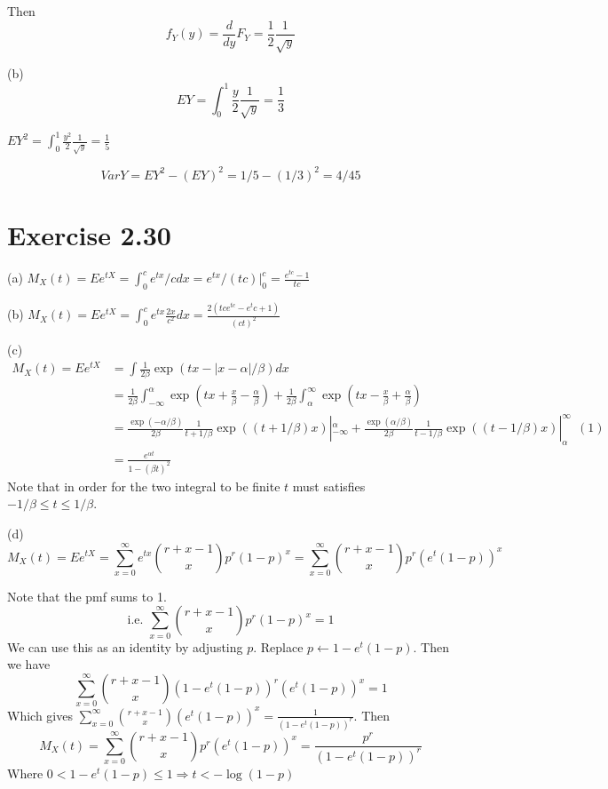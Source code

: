 \documentclass[12pt]{article}
\begin{document}
Then $$f_Y(y) = \frac{d}{dy}F_Y = \frac{1}{2}\frac{1}{\sqrt{y}}$$

(b) $$EY = \int^{1}_{0} \frac{y}{2}\frac{1}{\sqrt{y}} = \frac{1}{3}$$

$EY^2 = \int^1_0 \frac{y^2}{2} \frac{1}{\sqrt{y}} = \frac{1}{5}$

$$VarY = EY^2 - (EY)^2 = 1/5 - (1/3)^2 = 4/45 $$

\section*{Exercise 2.30}
(a) $M_X(t) = Ee^{tX} = \int_0^c e^{tx} /c dx =  e^{tx}/(tc)|^c_0 = \frac{e^{tc} - 1}{tc}$

(b) $M_X(t) = Ee^{tX} = \int_0^c e^{tx} \frac{2x}{c^2} dx = \frac{2(tce^{tc}-e^tc+1)}{(ct)^2} $

(c) $$\begin{aligned}
M_X(t)= Ee^{tX} &= \int \frac{1}{2\beta} \exp(tx - |x-\alpha|/\beta) dx \\
             &=\frac{1}{2\beta} \int_{-\infty}^{\alpha} \exp(tx + \frac{x}{\beta} - \frac{\alpha}{\beta})
             + \frac{1}{2\beta} \int_{\alpha}^{\infty} \exp(tx - \frac{x}{\beta} + \frac{\alpha}{\beta}) \\
             &=\frac{\exp(- \alpha/\beta)}{2\beta} \frac{1}{t+1/\beta}\exp((t +1/\beta)x) |_{-\infty}^{\alpha} + 
             \frac{\exp(\alpha/\beta)}{2\beta} \frac{1}{t -1/\beta}\exp((t -1/\beta)x) |^{\infty}_{\alpha} \ \ (1) \\
             &= \frac{e^{\alpha t}}{1-(\beta t)^2}
\end{aligned}
$$
Note that in order for the two integral to be finite $t$ must satisfies $-1/\beta \leq t \leq 1/\beta$.

(d) $$M_X(t) = Ee^{tX} = \sum_{x=0}^{\infty} e^{tx} {r+x-1 \choose x} p^r(1-p)^x = \sum_{x=0}^{\infty} {r+x-1 \choose x} p^r(e^{t}(1-p))^x $$

Note that the pmf sums to 1. $$\mbox{i.e.   } \sum_{x=0}^{\infty}{r+x-1 \choose x} p^r(1-p)^x = 1$$ 
We can use this as an identity by adjusting $p$. Replace $p \leftarrow 1 - e^t(1-p)$. Then we have
$$\sum_{x=0}^{\infty}{r+x-1 \choose x}( 1 - e^t(1-p))^r(e^t(1-p))^x = 1$$
Which gives $\sum_{x=0}^{\infty}{r+x-1 \choose x}(e^t(1-p))^x = \frac{1}{( 1 - e^t(1-p))^r}$.
Then $$M_X(t) = \sum_{x=0}^{\infty} {r+x-1 \choose x} p^r(e^{t}(1-p))^x =  \frac{p^r}{( 1 - e^t(1-p))^r}$$
Where $0<1 - e^t(1-p) \leq 1 \Rightarrow t < -\log (1-p)$ 
\end{document}
